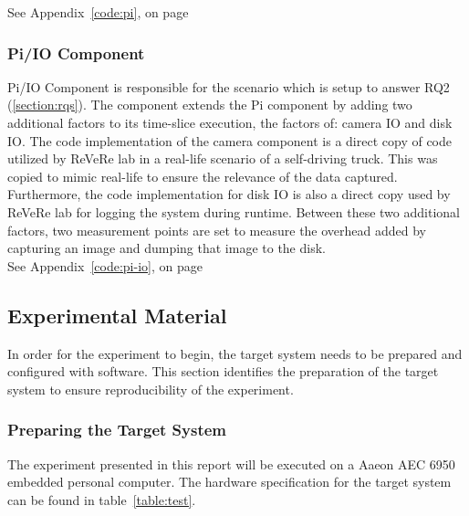 See Appendix~\ref{code:pi}, on page ~\pageref{code:pi}

\subsubsection{Pi/IO Component}

Pi/IO Component is responsible for the scenario which is setup to answer RQ2 (\ref{section:rqs}). The component extends the Pi component by adding two additional factors to its time-slice execution, the factors of: camera IO and disk IO. The code implementation of the camera component is a direct copy of code utilized by ReVeRe lab in a real-life scenario of a self-driving truck. This was copied to mimic real-life to ensure the relevance of the data captured. Furthermore, the code implementation for disk IO is also a direct copy used by ReVeRe lab for logging the system during runtime. Between these two additional factors, two measurement points are set to measure the overhead added by capturing an image and dumping that image to the disk.\\

See Appendix~\ref{code:pi-io}, on page ~\pageref{code:pi-io}


\subsection{Experimental Material}
In order for the experiment to begin, the target system needs to be prepared and configured with software. This section identifies the preparation of the target system to ensure reproducibility of the experiment.

\subsubsection{Preparing the Target System}
The experiment presented in this report will be executed on a Aaeon AEC 6950 embedded personal computer.  The hardware specification for the target system can be found in table~\ref{table:test}. 

